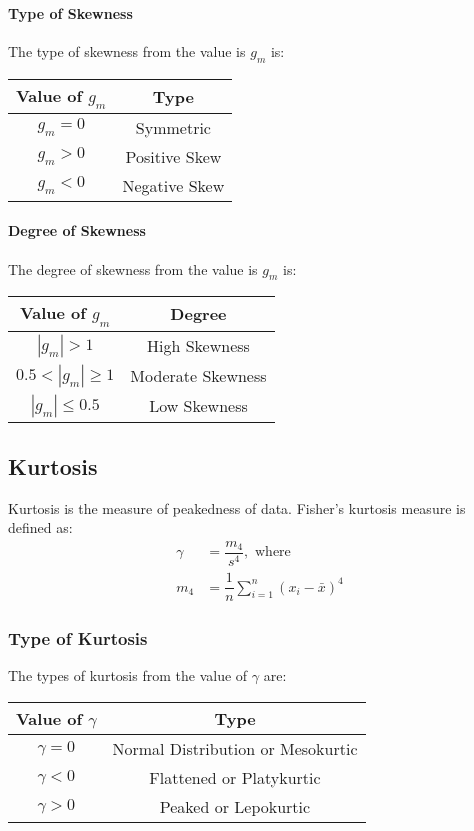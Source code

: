 \documentclass[openany,b5paper]{article}
\begin{document}
\paragraph{Type of Skewness}
The type of skewness from the value is $g_m$ is:
\begin{table}[h!]
\begin{tabular}{c|c}
Value of $g_m$ & Type\\
\hline
$g_m = 0$ & Symmetric\\
$g_m > 0$ & Positive Skew\\
$g_m < 0$ & Negative Skew
\end{tabular}
\end{table}

\paragraph{Degree of Skewness}
The degree of skewness from the value is $g_m$ is:
\begin{table}[h!]
\begin{tabular}{c|c}
Value of $g_m$ & Degree\\
\hline
$|g_m| > 1$ & High Skewness\\
$0.5 <|g_m| \geq 1$ & Moderate Skewness\\
$|g_m| \leq 0.5$ & Low Skewness
\end{tabular}
\end{table}

\subsection{Kurtosis}
Kurtosis is the measure of peakedness of data. Fisher's kurtosis measure is defined as:
\begin{align}
\gamma &= \dfrac{m_4}{s^4}, \text{ where}\\
m_4 &= \dfrac{1}{n}\sum_{i=1}^{n} \left( x_i - \bar{x} \right)^4
\end{align}

\subsubsection{Type of Kurtosis}
The types of kurtosis from the value of $\gamma$ are:
\begin{table}[h!]
\begin{tabular}{c|c}
Value of $\gamma$ & Type\\
\hline
$\gamma = 0$ & Normal Distribution or Mesokurtic\\
$\gamma < 0$ & Flattened or Platykurtic\\
$\gamma > 0$ & Peaked or Lepokurtic
\end{tabular}
\end{table}
\end{document}
